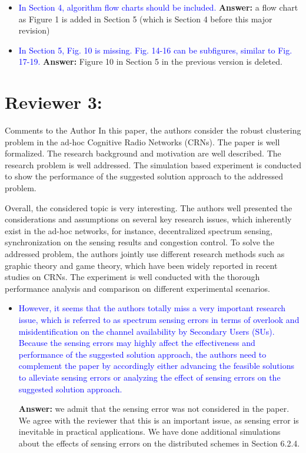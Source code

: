 \documentclass[10pt,a4paper]{article}
\begin{document}
\begin{itemize}
\item \textcolor{blue}{ In Section 4, algorithm flow charts should be included.}
\textbf{Answer:} a flow chart as Figure 1 is added in Section 5 (which is Section 4 before this major revision)

\item \textcolor{blue}{ In Section 5, Fig. 10 is missing. Fig. 14-16 can be subfigures, similar to Fig. 17-19.}
\textbf{Answer:} Figure 10 in Section 5 in the previous version is deleted.

\end{itemize}

\section{Reviewer 3:}


Comments to the Author
In this paper, the authors consider the robust clustering problem in the ad-hoc Cognitive Radio Networks (CRNs). The paper is well formalized. The research background and motivation are well described. The research problem is well addressed. The simulation based experiment is conducted to show the performance of the suggested solution approach to the addressed problem.

Overall, the considered topic is very interesting. The authors well presented the considerations and assumptions on several key research issues, which inherently exist in the ad-hoc networks, for instance, decentralized spectrum sensing, synchronization on the sensing results and congestion control. To solve the addressed problem, the authors jointly use different research methods such as graphic theory and game theory, which have been widely reported in recent studies on CRNs. The experiment is well conducted with the thorough performance analysis and comparison on different experimental scenarios.
\begin{itemize}
\item \textcolor{blue}{ However, it seems that the authors totally miss a very important research issue, which is referred to as spectrum sensing errors in terms of overlook and misidentification on the channel availability by Secondary Users (SUs). Because the sensing errors may highly affect the effectiveness and performance of the suggested solution approach, the authors need to complement the paper by accordingly either advancing the feasible solutions to alleviate sensing errors or analyzing the effect of sensing errors on the suggested solution approach.}

 \textbf{Answer:} we admit that the sensing error was not considered in the paper.
We agree with the reviewer that this is an important issue, as sensing error is inevitable in practical applications.
We have done additional simulations about the effects of sensing errors on the distributed schemes in Section 6.2.4.
\end{itemize}

%


\end{document}

